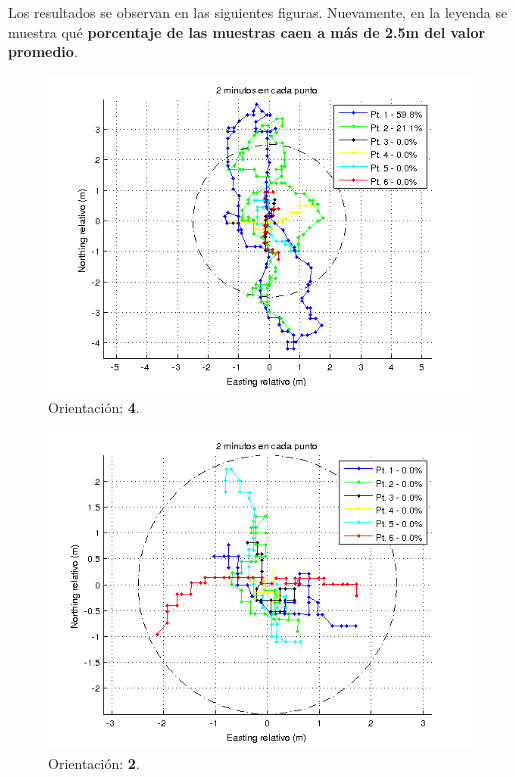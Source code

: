 \documentclass[spanish,12pt,a4paper,titlepage]{report}
\begin{document}
Los resultados se observan en las siguientes figuras. Nuevamente, en la leyenda se muestra qué \textbf{porcentaje de las muestras caen a más de 2.5m del valor promedio}.

\newpage
\begin{figure}[h!]
  \includegraphics[width=.9\textwidth]{./img/2m_or1_todos.png}
  \caption{Orientación: \textbf{4}.}
\vspace{-30pt}
  \label{fig:2m_or1_todos.png}
\end{figure}

\begin{figure}[h!]
  \includegraphics[width=1\textwidth]{./img/2m_or2_todos.png}
  \caption{Orientación: \textbf{2}.}
  \label{fig:2m_or2_todos.png}
\end{figure}
\end{document}
